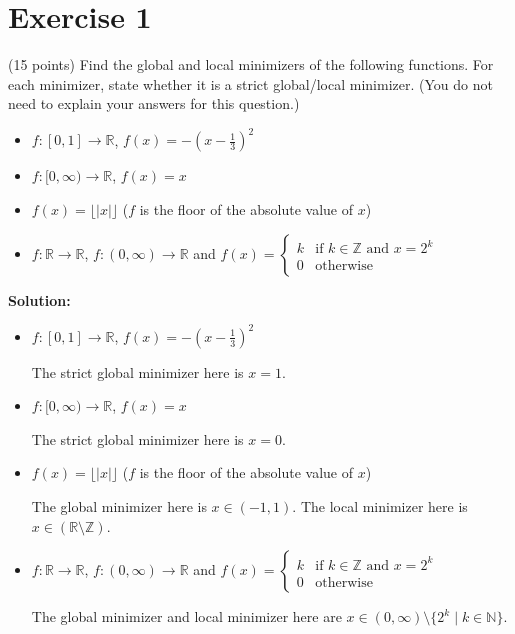 \documentclass{article}
\begin{document}
\section*{Exercise 1}
(15 points) Find the global and local minimizers of the following functions. For each minimizer, state whether it is a strict global/local minimizer. (You do not need to explain your answers for this question.)

\begin{itemize}
    \item $f: [0,1] \to \mathbb{R}$, $f(x) = -(x-\frac{1}{3})^2$
    \item $f: [0,\infty) \to \mathbb{R}$, $f(x) = x$
    \item $f(x) = \lfloor|x|\rfloor$ ($f$ is the floor of the absolute value of $x$)
    \item $f: \mathbb{R} \to \mathbb{R}$, $f: (0,\infty) \to \mathbb{R}$ and $f(x) = \begin{cases} 
        k & \text{if } k \in \mathbb{Z} \text{ and } x = 2^k \\
        0 & \text{otherwise}
    \end{cases}$
\end{itemize}

\textbf{Solution:}

\begin{itemize}
    \item $f: [0,1] \to \mathbb{R}$, $f(x) = -(x-\frac{1}{3})^2$
    
    The strict global minimizer here is $x = 1$.
    \item $f: [0,\infty) \to \mathbb{R}$, $f(x) = x$
    
    The strict global minimizer here is $x = 0$.
    \item $f(x) = \lfloor|x|\rfloor$ ($f$ is the floor of the absolute value of $x$)
    
    The global minimizer here is $x \in (-1, 1)$. The local minimizer here is $x \in (\mathbb{R} \setminus \mathbb{Z})$.
    \item $f: \mathbb{R} \to \mathbb{R}$, $f: (0,\infty) \to \mathbb{R}$ and $f(x) = \begin{cases} 
        k & \text{if } k \in \mathbb{Z} \text{ and } x = 2^k \\
        0 & \text{otherwise}
    \end{cases}$

    The global minimizer and local minimizer here are $x \in (0, \infty) \setminus \{2^k \mid k \in \mathbb{N}\}$.
\end{itemize}
\end{document}
